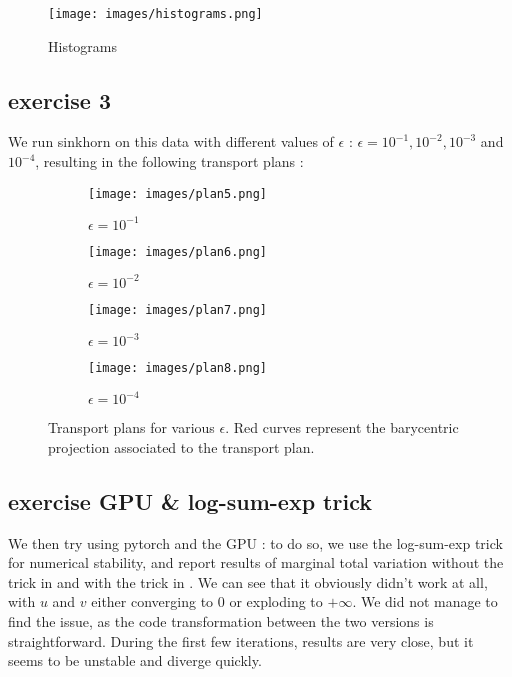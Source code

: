 \documentclass[a4paper,11pt]{article}
\newcommand{\1}{\mathbbm{1}}
\begin{document}
\begin{figure}[H]
    \centering
    \texttt{[image: images/histograms.png]}
    \caption{Histograms}
    \label{fig:histograms}
\end{figure}

\subsection{exercise 3}

We run sinkhorn on this data with different values of $\epsilon$ : $\epsilon = 10^{-1}, 10^{-2}, 10^{-3}$ and $10^{-4}$, resulting in the following transport plans :

\begin{figure}[H]
    \centering
    \begin{subfigure}{0.4\linewidth}
        \centering
        \texttt{[image: images/plan5.png]}
        \caption{$\epsilon = 10^{-1}$}
        \label{fig:plan5}
    \end{subfigure}
    \hfill
    \begin{subfigure}{0.4\linewidth}
        \centering
        \texttt{[image: images/plan6.png]}
        \caption{$\epsilon = 10^{-2}$}
        \label{fig:plan6}
    \end{subfigure}
    \vfill
    \begin{subfigure}{0.4\linewidth}
        \centering
        \texttt{[image: images/plan7.png]}
        \caption{$\epsilon = 10^{-3}$}
        \label{fig:plan7}
    \end{subfigure}
    \hfill
    \begin{subfigure}{0.4\linewidth}
        \centering
        \texttt{[image: images/plan8.png]}
        \caption{$\epsilon = 10^{-4}$}
        \label{fig:plan8}
    \end{subfigure}
    \caption{Transport plans for various $\epsilon$. Red curves represent the barycentric projection associated to the transport plan.}
    \label{fig:plans2}
\end{figure}

\subsection{exercise GPU & log-sum-exp trick}

We then try using pytorch and the GPU : to do so, we use the log-sum-exp trick for numerical stability, and report results of marginal total variation without the trick in  and with the trick in . We can see that it obviously didn't work at all, with $u$ and $v$ either converging to $0$ or exploding to $+\infty$. We did not manage to find the issue, as the code transformation between the two versions is straightforward. During the first few iterations, results are very close, but it seems to be unstable and diverge quickly.
\end{document}
